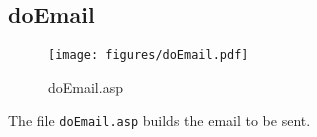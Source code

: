 \subsection{doEmail}
\begin{figure}[htb]
    \begin{center}
        \texttt{[image: figures/doEmail.pdf]}
    \end{center}
    \caption{doEmail.asp}
    \label{fig:doEmail}
\end{figure}

The file \verb|doEmail.asp| builds the email to be sent.
